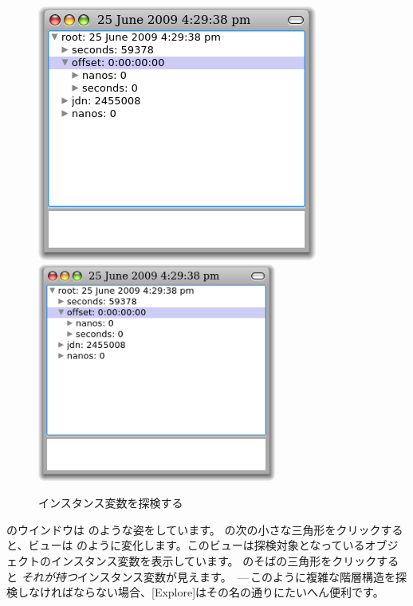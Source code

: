 \documentclass[a4paper,10pt,twoside]{book}
\begin{document}
\begin{figure}[tbp]
\begin{minipage}{0.48\textwidth}
\begin{center}
		{\includegraphics[width=\textwidth]{exploreTimeStampNow2}}
		{\includegraphics[width=0.7\textwidth]{exploreTimeStampNow2}}
	\end{center}
	\caption{インスタンス変数を探検する}
\end{minipage}
\end{figure}

\ind{[Explore]}のウインドウは  のような姿をしています。
 の次の小さな三角形をクリックすると、ビューは  のように変化します。このビューは探検対象となっているオブジェクトのインスタンス変数を表示しています。
 のそばの三角形をクリックすると \emph{それが持つ}インスタンス変数が見えます。
\,---\,このように複雑な階層構造を探検しなければならない場合、[Explore]はその名の通りにたいへん便利です。
\end{document}
